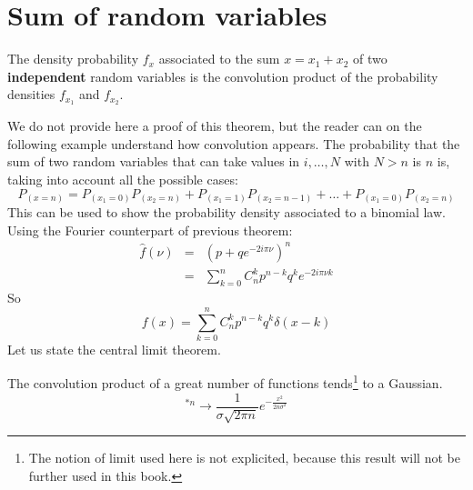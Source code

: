\documentclass[12pt]{book}
\begin{document}
\section{Sum of random variables}
\begin{thm}
The density probability $f_x$ associated to the sum $x=x_1+x_2$ of two {\bf
  independent} random variables is the convolution product of the probability
densities $f_{x_1}$ and $f_{x_2}$.
\end{thm}
We do not provide here a proof of this theorem, but the reader can on the
following example understand how convolution appears. The probability that the
sum of two random variables that can take values in $i,\dots,N$ with $N>n$ is
$n$ is,
taking into account all the possible cases:
\begin{equation}
P_{(x=n)}=P_{(x_1=0)}P_{(x_2=n)}+
P_{(x_1=1)}P_{(x_2=n-1)}+\dots+P_{(x_1=0)}P_{(x_2=n)} 
\end{equation}
This can be used to show the probability density associated to a binomial
law. Using the Fourier counterpart of previous theorem:
\begin{eqnarray}
\hat{f}(\nu)&=&(p+qe^{-2i\pi \nu})^n \nonumber\\
&=&\sum_{k=0}^{n}C_n^k p^{n-k}q^{k}e^{-2i\pi \nu k}
\end{eqnarray}
So
\begin{equation}
f(x)=\sum_{k=0}^{n}C_n^k p^{n-k}q^{k}\delta(x-k)
\end{equation}
Let us state the central limit theorem.
\begin{thm}
The convolution product of a great number of functions tends\footnote{%
The notion of limit used here is not explicited, because this result will not
be further used in this book.
}%
 to a Gaussian.
\begin{equation}
[f(x)]^{*n} \longrightarrow \frac{1}{\sigma\sqrt{2\pi
n}}e^{-\frac{x^2}{2n\sigma^2}} 
\end{equation}
\end{thm}
\end{document}
